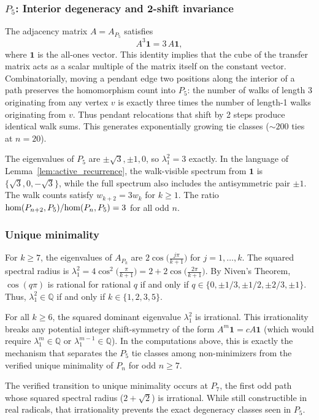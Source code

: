 \subsubsection{\texorpdfstring{$P_5$}{P5}: Interior degeneracy and 2-shift invariance}

The adjacency matrix $A = A_{P_5}$ satisfies
\begin{equation}
  \label{eq:shift}
  A^3 \mathbf{1} = 3\, A \mathbf{1},
\end{equation}
where $\mathbf{1}$ is the all-ones vector. This identity implies that
the cube of the transfer matrix acts as a scalar multiple of the
matrix itself on the constant vector. Combinatorially, moving a pendant
edge two positions along the interior of a path preserves the
homomorphism count into $P_5$: the number of walks of length 3
originating from any vertex $v$ is exactly three times the number of
length-1 walks originating from $v$. Thus pendant relocations that
shift by 2 steps produce identical walk sums. This generates
exponentially growing tie classes ($\sim\!200$ ties at $n = 20$).

The eigenvalues of $P_5$ are $\pm\sqrt{3}, \pm 1, 0$, so
$\lambda_1^2 = 3$ exactly. In the language of
Lemma~\ref{lem:active_recurrence}, the walk-visible spectrum from
$\mathbf{1}$ is $\{\sqrt{3}, 0, -\sqrt{3}\}$, while the full spectrum also
includes the antisymmetric pair $\pm1$. The walk counts satisfy
$w_{k+2} = 3w_k$ for $k \ge 1$. The ratio
$\mathrm{hom}(P_{n+2}, P_5) / \allowbreak \mathrm{hom}(P_n, P_5) = 3$ for all odd $n$.

\subsubsection{Unique minimality}

For $k \ge 7$, the eigenvalues of $A_{P_k}$ are
$2\cos\bigl(\frac{j\pi}{k+1}\bigr)$ for $j = 1, \ldots, k$.
The squared spectral radius is $\lambda_1^2 = 4\cos^2\bigl(\frac{\pi}{k+1}\bigr) = 2 + 2\cos\bigl(\frac{2\pi}{k+1}\bigr)$.
By Niven's Theorem, $\cos(q\pi)$ is rational for rational $q$ if and only if
$q \in \{0, \pm 1/3, \pm 1/2, \pm 2/3, \pm 1\}$. Thus, $\lambda_1^2 \in \mathbb{Q}$ if and only if $k \in \{1, 2, 3, 5\}$.

For all $k \ge 6$, the squared dominant eigenvalue $\lambda_1^2$ is
irrational. This irrationality breaks any potential integer
shift-symmetry of the form $A^m \mathbf{1} = cA \mathbf{1}$ (which
would require $\lambda_1^m \in \mathbb{Q}$ or $\lambda_1^{m-1} \in
\mathbb{Q}$). In the computations above, this is exactly the mechanism
that separates the $P_5$ tie classes among non-minimizers from the verified unique
minimality of $P_n$ for odd $n \ge 7$.

\begin{remark}[Irrationality]
  The verified transition to unique minimality occurs at $P_7$, the
  first odd path whose squared spectral radius ($2+\sqrt{2}$) is
  irrational. While still constructible in real radicals, that
  irrationality prevents the exact degeneracy classes seen in $P_5$.
\end{remark}

